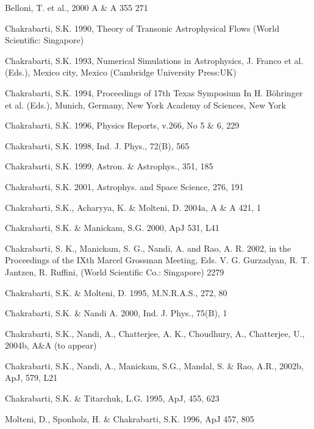 \documentclass[referee]{cjaa}           %
\begin{document}
\begin{thebibliography}{99}

\bibitem[]{}
Belloni, T. et al., 2000 A \& A 355 271

\bibitem[]{}
Chakrabarti, S.K. 1990, Theory of Transonic Astrophysical Flows (World Scientific: Singapore)

\bibitem[]{}
Chakrabarti, S.K. 1993, Numerical Simulations in Astrophysics, J. Franco et al.  (Eds.),
Mexico city, Mexico (Cambridge University Press:UK)

\bibitem[]{}
Chakrabarti, S.K. 1994, Proceedings of 17th Texas Symposium In  H. B\"ohringer et al. (Eds.),
Munich, Germany, New York Academy of Sciences, New York

\bibitem[]{}
Chakrabarti, S.K. 1996, Physics Reports, v.266, No 5 \& 6, 229

\bibitem[]{}
Chakrabarti, S.K. 1998, Ind. J. Phys., 72(B), 565

\bibitem[]{}
Chakrabarti, S.K. 1999, Astron. \& Astrophys., 351, 185

\bibitem[]{}
Chakrabarti, S.K. 2001, Astrophys. and Space Science, 276, 191

\bibitem[]{}
Chakrabarti, S.K., Acharyya, K. \& Molteni, D. 2004a, A \& A 421, 1

\bibitem[]{}
Chakrabarti, S.K. \& Manickam, S.G. 2000, ApJ 531, L41

\bibitem[]{}
Chakrabarti, S. K., Manickam, S. G., Nandi, A. and Rao, A. R. 2002, 
in the Proceedings of the IXth Marcel Grossman Meeting, Eds. V. G. Gurzadyan, R. T. Jantzen, 
R. Ruffini, (World Scientific Co.: Singapore) 2279

\bibitem[]{} 
Chakrabarti, S.K. \&  Molteni, D. 1995, M.N.R.A.S., 272, 80

\bibitem[]{}
Chakrabarti, S.K. \& Nandi A. 2000, Ind. J. Phys., 75(B), 1

\bibitem[]{}
Chakrabarti, S.K., Nandi, A.,  Chatterjee, A. K.,  Choudhury, A., Chatterjee, U., 2004b, A\&A (to appear)

\bibitem[]{}
Chakrabarti, S.K., Nandi, A., Manickam, S.G., Mandal, S. \& Rao, A.R., 2002b, ApJ, 579, L21

\bibitem[]{}
Chakrabarti, S.K. \& Titarchuk, L.G. 1995, ApJ, 455, 623

\bibitem[]{}
Molteni, D., Sponholz, H. \& Chakrabarti, S.K. 1996, ApJ 457, 805


\end{thebibliography}
\end{document}
